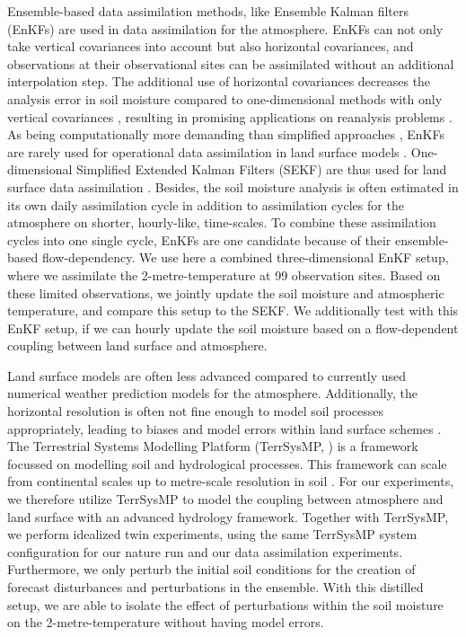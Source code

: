 \documentclass[hess, manuscript]{copernicus}
\begin{document}
Ensemble-based data assimilation methods, like Ensemble Kalman filters (EnKFs) are used in data assimilation for the atmosphere.
EnKFs can not only take vertical covariances into account but also horizontal covariances, and observations at their observational sites can be assimilated without an additional interpolation step.
The additional use of horizontal covariances decreases the analysis error in soil moisture compared to one-dimensional methods with only vertical covariances \citep{fairbairn_comparing_2015,reichle_extended_2002}, resulting in promising applications on reanalysis problems \citep{draper_assimilation_2019}.
As being computationally more demanding than simplified approaches \citep{reichle_assessing_2003}, EnKFs are rarely used for operational data assimilation in land surface models \cite{carrera_canadian_2015,milbrandt_pan-canadian_2016}.
One-dimensional Simplified Extended Kalman Filters (SEKF) are thus used for land surface data assimilation \citep{hess_assimilation_2001,rosnay_simplified_2013, mahfouf_comparison_2009,dharssi_operational_2011,belair_operational_2003,giard_implementation_2000}.
Besides, the soil moisture analysis is often estimated in its own daily assimilation cycle in addition to assimilation cycles for the atmosphere on shorter, hourly-like, time-scales.
To combine these assimilation cycles into one single cycle, EnKFs are one candidate because of their ensemble-based flow-dependency. 
We use here a combined three-dimensional EnKF setup, where we assimilate the 2-metre-temperature at 99 observation sites.
Based on these limited observations, we jointly update the soil moisture and atmospheric temperature, and compare this setup to the SEKF.
We additionally test with this EnKF setup, if we can hourly update the soil moisture based on a flow-dependent coupling between land surface and atmosphere.

Land surface models are often less advanced compared to currently used numerical weather prediction models for the atmosphere.
Additionally, the horizontal resolution is often not fine enough to model soil processes appropriately, leading to biases and model errors within land surface schemes \citep{dirmeyer_verification_2017, kauffeldt_imbalanced_2015, orth_advancing_2017, best_plumbing_2015}.
The Terrestrial Systems Modelling Platform (TerrSysMP, \citealt{shrestha_scale-consistent_2014, gasper_implementation_2014}) is a framework focussed on modelling soil and hydrological processes. 
This framework can scale from continental scales \citep{kollet_introduction_2018} up to metre-scale resolution in soil \citep{gebler_high_2017}.
For our experiments, we therefore utilize TerrSysMP to model the coupling between atmosphere and land surface with an advanced hydrology framework.
Together with TerrSysMP, we perform idealized twin experiments, using the same TerrSysMP system configuration for our nature run and our data assimilation experiments.
Furthermore, we only perturb the initial soil conditions for the creation of forecast disturbances and perturbations in the ensemble.
With this distilled setup, we are able to isolate the effect of perturbations within the soil moisture on the 2-metre-temperature without having model errors.
\end{document}
